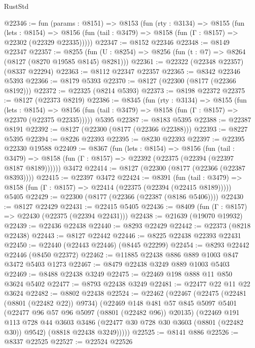 \begin{lexlean}{RustStd}
\begin{coremodule}
@22346 := fun (params : @8151) =>
  @8153
    (fun (rty : @3134) =>
    @8155
      (fun (lets : @8154) =>
      @8156 (fun (tail : @3479) => @8158 (fun (Γ : @8157) => @22302 (@22329 @22335)))))
@22347 := @8152 @22346
@22348 := @8149 @22347
@22357 := @8255
    (fun (U : @8254) => @8256 (fun (t : @7) => @8264 (@8127 (@8270 @19585 @8145) @8281)))
@22361 := @22322 (@22348 @22357) (@8337 @22294)
@22363 := @8112 @22347 @22357
@22365 := @8342 @22346 @5393
@22366 := @8179 @5393
@22370 := @8127 (@22300 (@8177 (@22366 @8192)))
@22372 := @22325 (@8214 @5393)
@22373 := @8198 @22372
@22375 := @8127 (@22373 @8219)
@22386 := @8345
    (fun (rty : @3134) =>
    @8155
      (fun (lets : @8154) =>
      @8156 (fun (tail : @3479) => @8158 (fun (Γ : @8157) => @22370 (@22375 @22335)))))
    @5395
@22387 := @8183 @5395
@22388 := @22387 @8191
@22392 := @8127 (@22300 (@8177 (@22366 @22388)))
@22393 := @8227 @5395
@22394 := @8226 @22393
@22395 := @8230 @22393
@22397 := @22395 @22330 @19588
@22409 := @8367
    (fun (lets : @8154) =>
    @8156
      (fun (tail : @3479) =>
      @8158 (fun (Γ : @8157) => @22392 (@22375 (@22394 (@22397 @8187 @8189))))))
    @3472
@22414 := @8127 (@22300 (@8177 (@22366 (@22387 @8393))))
@22415 := @22397 @3472
@22424 := @8391
    (fun (tail : @3479) => @8158 (fun (Γ : @8157) => @22414 (@22375 (@22394 (@22415 @8189)))))
    @5405
@22429 := @22300 (@8177 (@22366 (@22387 (@8186 @5406))))
@22430 := @8127 @22429
@22431 := @22415 @5405
@22436 := @8409 (fun (Γ : @8157) => @22430 (@22375 (@22394 @22431)))
@22438 := @21639 (@19070 @19932)
@22439 := @22436 @22438
@22440 := @8293 @22429
@22442 := @22373 (@8218 @22438)
@22443 := @8127 @22442
@22446 := @8225 @22438 @22393 @22431
@22450 := @22440 (@22443 @22446) (@8445 @22299)
@22454 := @8293 @22442 @22446 (@8450 @22372)
@22462 := @11885 @22438 @886 @889 @1003 @847 @3472 @5403 @1273
@22467 := @8479 @22438 @3249 @889 @1003 @5403
@22469 := @8488 @22438 @3249
@22475 := @22469 @198 @888 @11 @850 @3624 @5402
@22477 := @8793 @22438 @3249
@22481 := @22477 @22 @11 @22 @3624
@22482 := @8802 @22438
@22524 := @22462
    (@22467
      (@22475
        (@22481 (@8801 (@22482 @22)) @9734)
        (@22469
          @148
          @481
          @57
          @845
          @5097
          @5401
          (@22477 @96 @57 @96 @5097 (@8801 (@22482 @96)) @20135)
          (@22469
            @191
            @113
            @728
            @44
            @3603
            @3486
            (@22477 @30 @728 @30 @3603 (@8801 (@22482 @30)) @9542)
            (@8818 @22438 @3249)))))
@22525 := @8141 @886
@22526 := @8337 @22525
@22527 := @22524 @22526

\end{coremodule}
\end{lexlean}
